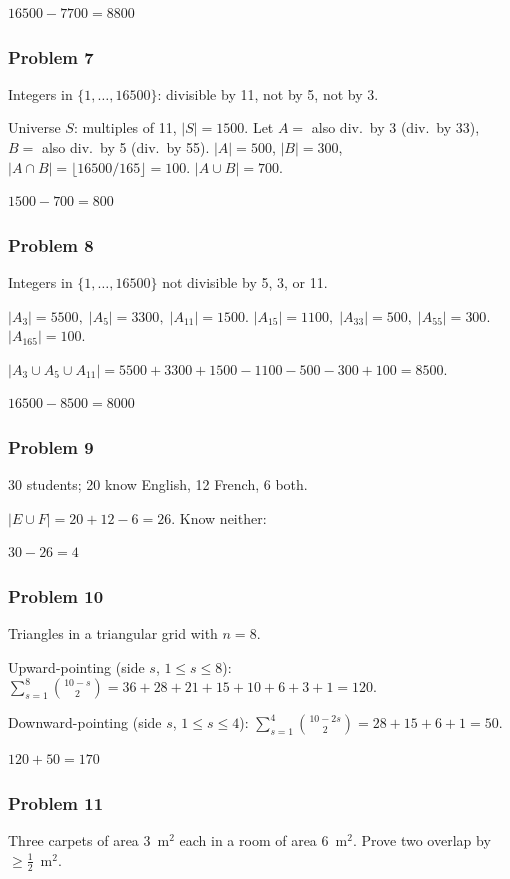 $\boxed{16500-7700=8800}$

\subsubsection*{Problem 7}
Integers in $\{1,\dots,16500\}$: divisible by 11, not by 5, not by 3.

Universe $S$: multiples of 11, $|S|=1500$. Let $A=$ also div.\ by 3 (div.\ by 33), $B=$ also div.\ by 5 (div.\ by 55).
$|A|=500$, $|B|=300$, $|A\cap B|=\lfloor 16500/165\rfloor=100$.
$|A\cup B|=700$.

$\boxed{1500-700=800}$

\subsubsection*{Problem 8}
Integers in $\{1,\dots,16500\}$ not divisible by 5, 3, or 11.

$|A_3|=5500,\;|A_5|=3300,\;|A_{11}|=1500$.
$|A_{15}|=1100,\;|A_{33}|=500,\;|A_{55}|=300$.
$|A_{165}|=100$.

$|A_3\cup A_5\cup A_{11}|=5500+3300+1500-1100-500-300+100=8500$.

$\boxed{16500-8500=8000}$

\subsubsection*{Problem 9}
30 students; 20 know English, 12 French, 6 both.

$|E\cup F|=20+12-6=26$. Know neither:

$\boxed{30-26=4}$

\subsubsection*{Problem 10}
Triangles in a triangular grid with $n=8$.

Upward-pointing (side $s$, $1\le s\le 8$): $\sum_{s=1}^{8}\binom{10-s}{2} = 36+28+21+15+10+6+3+1=120$.

Downward-pointing (side $s$, $1\le s\le 4$): $\sum_{s=1}^{4}\binom{10-2s}{2}=28+15+6+1=50$.

$\boxed{120+50=170}$

\subsubsection*{Problem 11}
Three carpets of area 3~m$^2$ each in a room of area 6~m$^2$. Prove two overlap by $\ge \frac{1}{2}$~m$^2$.

